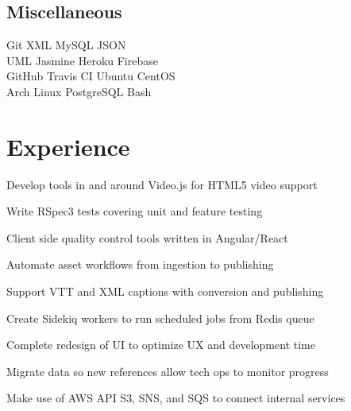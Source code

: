 \documentclass[]{deedy-resume-openfont}
\begin{document}
\begin{minipage}[t]{0.33\textwidth}
\subsection{Miscellaneous}
Git \textbullet{} XML \textbullet{} MySQL \textbullet{} JSON \\
UML \textbullet{} Jasmine \textbullet{}
Heroku \textbullet{} Firebase \\
GitHub \textbullet{} Travis CI \textbullet{} Ubuntu \textbullet{} CentOS \\
Arch Linux \textbullet{} PostgreSQL \textbullet{} Bash
\sectionsep

%
%

\end{minipage}
\hfill
\begin{minipage}[t]{0.66\textwidth}


\section{Experience}

\vspace{\topsep} %
\begin{tightemize}
\item Develop tools in and around Video.js for HTML5 video support
\item Write RSpec3 tests covering unit and feature testing
\item Client side quality control tools written in Angular/React
\item Automate asset workflows from ingestion to publishing
\item Support VTT and XML captions with conversion and publishing
\item Create Sidekiq workers to run scheduled jobs from Redis queue
\item Complete redesign of UI to optimize UX and development time
\item Migrate data so new references allow tech ops to monitor progress
\item Make use of AWS API S3, SNS, and SQS to connect internal services
\end{tightemize}
\sectionsep


\end{minipage}
\end{document}
